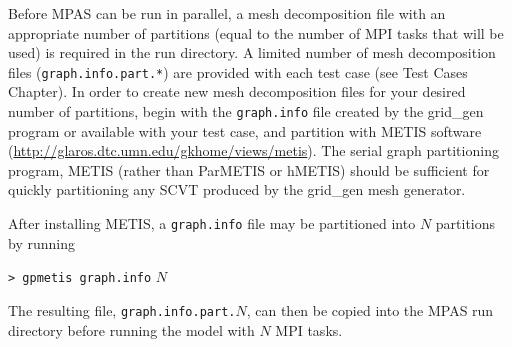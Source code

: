 Before MPAS can be run in parallel, a mesh decomposition file with an appropriate number of 
partitions (equal to the number of MPI tasks that will be used) is required in the run directory.  A limited number of mesh decomposition files ({\tt graph.info.part.*}) are provided with each test case (see Test Cases Chapter).  In order to create new mesh decomposition files for your desired number of partitions, begin with the {\tt graph.info} file created by the grid\_gen program or available with your test case, and partition with METIS software (\url{http://glaros.dtc.umn.edu/gkhome/views/metis}). The serial graph partitioning program, METIS (rather than ParMETIS or hMETIS) should be sufficient for quickly partitioning any SCVT produced by the grid\_gen mesh generator.

After installing METIS, a {\tt graph.info} file may be partitioned into $N$ partitions by running

\vspace{12pt}
{\tt > gpmetis graph.info} $N$
\vspace{12pt}

\noindent The resulting file, {\tt graph.info.part.}$N$, can then be copied into the MPAS run directory
before running the model with $N$ MPI tasks.

